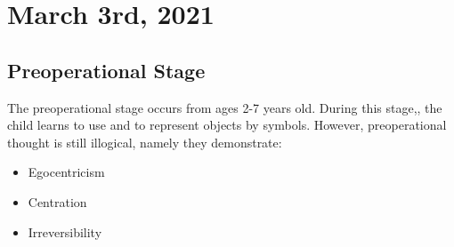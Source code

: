 \documentclass[../main/main.tex]{subfiles}
\begin{document}
\section{March 3rd, 2021}
\subsection{Preoperational Stage}
The preoperational stage occurs from ages 2-7 years old. During this stage,, the child learns to use and to represent objects by symbols. However, preoperational thought is still illogical, namely they demonstrate:
\begin{itemize}
\item Egocentricism
\item Centration
\item Irreversibility
\end{itemize}
\end{document}
